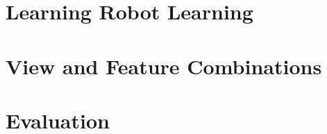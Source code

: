 \appendix

\chapter{Learning Robot Learning}


\chapter{View and Feature Combinations}



\chapter{Evaluation}
